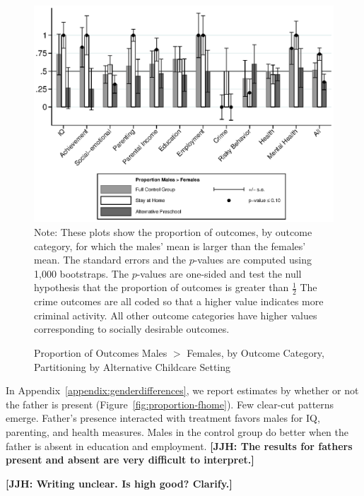 \begin{figure}[H]
\centering
\caption{Proportion of Outcomes Males $>$ Females, by Outcome Category, Partitioning by Alternative Childcare Setting}
\label{fig:proportion-altpre}
	\includegraphics[width=\textwidth]{output/gendergaps-control-moderated-altpre}
\footnotesize \justify
Note: These plots show the proportion of outcomes, by outcome category, for which the males' mean is larger than the females' mean. The standard errors and the $p$-values are computed using 1,000 bootstraps. The $p$-values are one-sided and test the null hypothesis that the proportion of outcomes is greater than $\frac{1}{2}$ The crime outcomes are all coded so that a higher value indicates more criminal activity. All other outcome categories have higher values corresponding to socially desirable outcomes.
\end{figure}

In Appendix~\ref{appendix:genderdifferences}, we report estimates by whether or not the father is present (Figure~\ref{fig:proportion-fhome}). Few clear-cut patterns emerge. Father's presence interacted with treatment favors males for IQ, parenting, and health measures. Males in the control group do better when the father is absent in education and employment. \textbf{[JJH: The results for fathers present and absent are very difficult to interpret.]}

\textbf{[JJH: Writing unclear. Is high good? Clarify.]}

